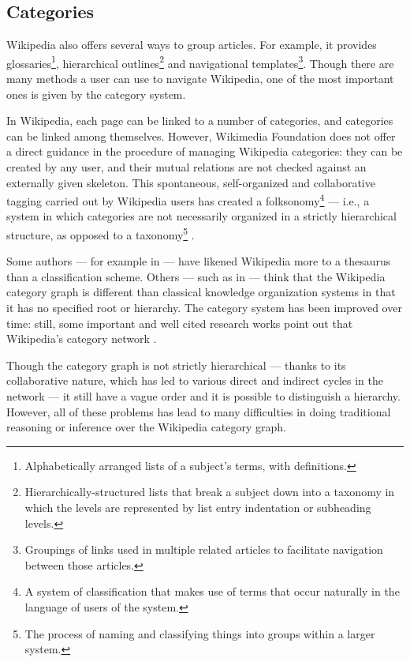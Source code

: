         \subsection{Categories}\label{wikipedia:categories}
            Wikipedia also offers several ways to group articles. For example, it provides glossaries\footnote{Alphabetically arranged lists of a subject's terms, with definitions.}, hierarchical outlines\footnote{Hierarchically-structured lists that break a subject down into a taxonomy in which the levels are represented by list entry indentation or subheading levels.} and navigational templates\footnote{Groupings of links used in multiple related articles to facilitate navigation between those articles.}. Though there are many methods a user can use to navigate Wikipedia, one of the most important ones is given by the category system.
            
            In Wikipedia, each page can be linked to a number of categories, and categories can be linked among themselves. However, Wikimedia Foundation does not offer a direct guidance in the procedure of managing Wikipedia categories: they can be created by any user, and their mutual relations are not checked against an externally given skeleton. This spontaneous, self-organized and collaborative tagging carried out by Wikipedia users has created a folksonomy\footnote{A system of classification that makes use of terms that occur naturally in the language of users of the system.} --- i.e., a system in which categories are not necessarily organized in a strictly hierarchical structure, as opposed to a taxonomy\footnote{The process of naming and classifying things into groups within a larger system.} \cite{Salah}.
            
            Some authors --- for example \citeauthor{Voss} in \cite{Voss} --- have likened Wikipedia more to a thesaurus than a classification scheme. Others --- such as \citeauthor{Suchecki} in \cite{Suchecki} --- think that the Wikipedia category graph is different than classical knowledge organization systems in that it has no specified root or hierarchy. The category system has been improved over time: still, some important and well cited research works point out that Wikipedia's category network  \cite{Kittur}.
            
            Though the category graph is not strictly hierarchical --- thanks to its collaborative nature, which has led to various direct and indirect cycles in the network --- it still have a vague order and it is possible to distinguish a hierarchy. However, all of these problems has lead to many difficulties in doing traditional reasoning or inference over the Wikipedia category graph.
